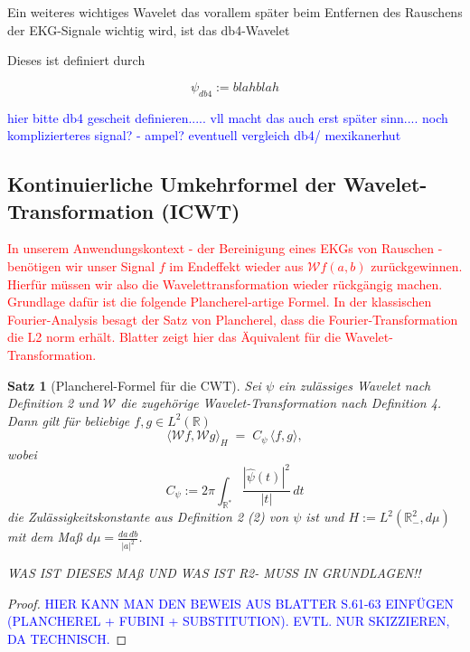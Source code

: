 \documentclass[a4paper,11pt,bibliography=totoc,listof=totoc,headinclude=true,cleardoublepage=empty,oneside]{scrbook}
\newtheorem{theorem}{Satz}
\theoremstyle{definition}
\theoremstyle{remark}
\begin{document}
Ein weiteres wichtiges Wavelet das vorallem später beim Entfernen des Rauschens der EKG-Signale wichtig wird, ist das db4-Wavelet 

Dieses ist definiert durch 

\[
\psi_{db4} := blahblah
\]
 
\textcolor{blue}{hier bitte db4 gescheit definieren..... vll macht das auch erst später sinn....}
\textcolor{blue}{noch komplizierteres signal? - ampel?}
\textcolor{blue}{eventuell vergleich db4/ mexikanerhut}


  \subsection{Kontinuierliche Umkehrformel der Wavelet-Transformation (ICWT)}
  
  
  \textcolor{red}{In unserem Anwendungskontext - der Bereinigung eines EKGs von Rauschen - benötigen wir 
  unser Signal $f$ im Endeffekt wieder aus $\mathcal{W}f(a,b)$ zurückgewinnen. 
  Hierfür müssen wir also die Wavelettransformation wieder rückgängig machen. 
  Grundlage dafür ist die folgende Plancherel-artige Formel.
  In der klassischen Fourier-Analysis besagt der Satz von Plancherel, dass die Fourier-Transformation die L2 norm erhält.
  Blatter zeigt hier das Äquivalent für die Wavelet-Transformation.}

  \begin{theorem}[Plancherel-Formel für die CWT] \cite[Satz 3.3, S. 62]{blatterWaveletsEinfuhrung2003}
   Sei $\psi$ ein zulässiges Wavelet nach Definition 2 und
   $\mathcal{W}$ die zugehörige Wavelet-Transformation nach Definition 4. Dann gilt für beliebige
   $f, g \in L^2(\mathbb{R})$
   \[
     \langle \mathcal{W}f, \mathcal{W}g \rangle_H \;=\; C_\psi \, \langle f, g \rangle ,
   \]
   wobei
   \[
     C_\psi := 2\pi \int_{\mathbb{R}^*} \frac{|\hat\psi(t)|^2}{|t|}\, dt
   \]
   die Zulässigkeitskonstante aus Definition 2 (2) von $\psi$ ist und $H := L^2(\mathbb{R}^2_-, d\mu)$
   mit dem Maß $d\mu = \frac{da\,db}{|a|^2}$.

   WAS IST DIESES MAß UND WAS IST R2- MUSS IN GRUNDLAGEN!!
  \end{theorem}
   
  \begin{proof}
   \textcolor{blue}{HIER KANN MAN DEN BEWEIS AUS BLATTER S.61-63 EINFÜGEN (PLANCHEREL
   + FUBINI + SUBSTITUTION). EVTL. NUR SKIZZIEREN, DA TECHNISCH.}
  \end{proof}
  
\end{document}
